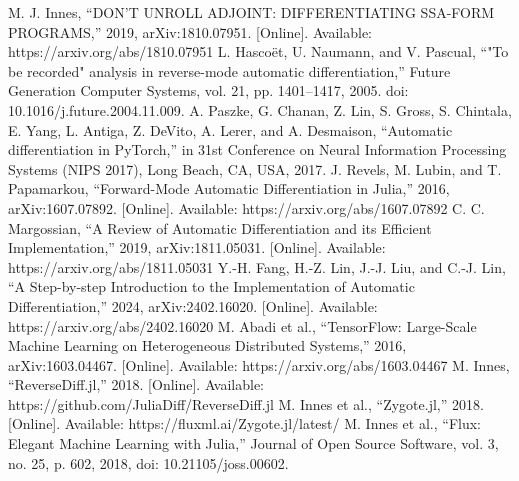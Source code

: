 \documentclass[conference]{IEEEtran}
\begin{document}
\begin{thebibliography}{00}
 M. J. Innes, ``DON'T UNROLL ADJOINT: DIFFERENTIATING SSA-FORM PROGRAMS,'' 2019, arXiv:1810.07951. [Online]. Available: https://arxiv.org/abs/1810.07951
 L. Hascoët, U. Naumann, and V. Pascual, ``"To be recorded" analysis in reverse-mode automatic differentiation,'' Future Generation Computer Systems, vol. 21, pp. 1401--1417, 2005. doi: 10.1016/j.future.2004.11.009.
 A. Paszke, G. Chanan, Z. Lin, S. Gross, S. Chintala, E. Yang, L. Antiga, Z. DeVito, A. Lerer, and A. Desmaison, ``Automatic differentiation in PyTorch,'' in 31st Conference on Neural Information Processing Systems (NIPS 2017), Long Beach, CA, USA, 2017.
 J. Revels, M. Lubin, and T. Papamarkou, ``Forward-Mode Automatic Differentiation in Julia,'' 2016, arXiv:1607.07892. [Online]. Available: https://arxiv.org/abs/1607.07892
 C. C. Margossian, ``A Review of Automatic Differentiation and its Efficient Implementation,'' 2019, arXiv:1811.05031. [Online]. Available: https://arxiv.org/abs/1811.05031
 Y.-H. Fang, H.-Z. Lin, J.-J. Liu, and C.-J. Lin, ``A Step-by-step Introduction to the Implementation of Automatic Differentiation,'' 2024, arXiv:2402.16020. [Online]. Available: https://arxiv.org/abs/2402.16020
 M. Abadi et al., ``TensorFlow: Large-Scale Machine Learning on Heterogeneous Distributed Systems,'' 2016, arXiv:1603.04467. [Online]. Available: https://arxiv.org/abs/1603.04467
 M. Innes, ``ReverseDiff.jl,'' 2018. [Online]. Available: https://github.com/JuliaDiff/ReverseDiff.jl
 M. Innes et al., ``Zygote.jl,'' 2018. [Online]. Available: https://fluxml.ai/Zygote.jl/latest/
 M. Innes et al., ``Flux: Elegant Machine Learning with Julia,'' Journal of Open Source Software, vol. 3, no. 25, p. 602, 2018, doi: 10.21105/joss.00602.
\end{thebibliography}
\end{document}

